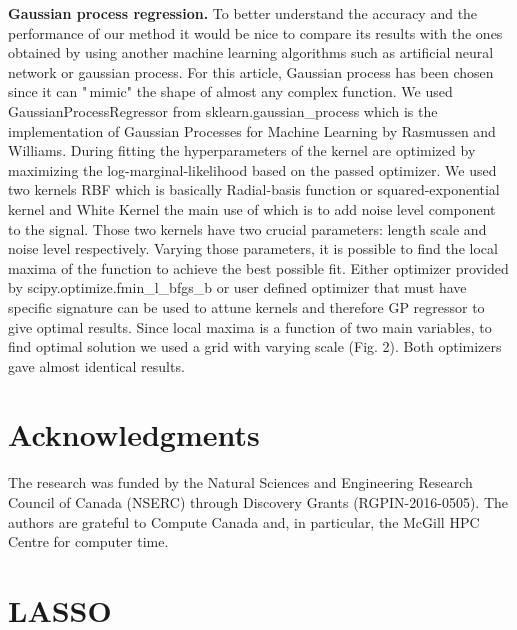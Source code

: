 \documentclass[aps,prl,reprint,amsmath,amssymb,nature]{revtex4-1}
\begin{document}
\textbf{Gaussian process regression. }To better understand the 
accuracy and the performance of our method it would be nice to compare 
its results with the ones obtained by using another machine learning 
algorithms such as artificial neural network or gaussian process. For 
this article, Gaussian process has been chosen since it can "\,mimic" 
the shape of almost any complex function. We used 
GaussianProcessRegressor from sklearn.gaussian\_process which is the 
implementation of Gaussian Processes for Machine Learning by Rasmussen 
and Williams. During fitting the hyperparameters of the kernel are 
optimized by maximizing the log-marginal-likelihood based on the passed 
optimizer. We used two kernels RBF which is basically Radial-basis 
function or squared-exponential kernel and White Kernel the main use of 
which is to add noise level component to the signal. Those two kernels 
have two crucial parameters: length scale and noise level respectively. 
Varying those parameters, it is possible to find the local maxima of the 
function to achieve the best possible fit. Either optimizer provided by 
scipy.optimize.fmin\_l\_bfgs\_b or user defined optimizer that must have 
specific signature can be used to attune kernels and therefore GP 
regressor to give optimal results. Since local maxima is a function of 
two main variables, to find optimal solution we used a grid with varying 
scale (Fig. 2). Both optimizers gave almost identical results. 

\section{Acknowledgments} 

The research was funded by the Natural Sciences and Engineering Research Council of Canada (NSERC) through Discovery
Grants (RGPIN-2016-0505). The authors are grateful to Compute Canada and, in particular, the McGill HPC Centre for computer time.




\newpage
\clearpage
\setcounter{figure}{0}
\setcounter{page}{1}
\renewcommand{\thefigure}{S\arabic{figure}}


\section{LASSO} 
\end{document}
